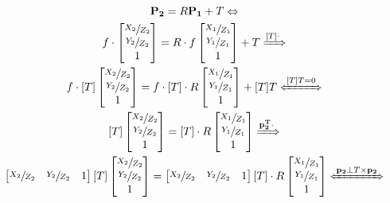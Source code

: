 \begin{equation}
\begin{gathered}
	\mathbf{P_2}  = R\mathbf{P_1} + T \Leftrightarrow \\
	f \cdot \begin{bmatrix} \sfrac{X_2}{Z_2} \\ \sfrac{Y_2}{Z_2} \\ 1 \end{bmatrix} = R \cdot f
	\begin{bmatrix} \sfrac{X_1}{Z_1} \\ \sfrac{Y_1}{Z_1} \\ 1 \end{bmatrix} + T \xRightarrow{[T] \cdot} \\
	f \cdot [T] \begin{bmatrix} \sfrac{X_2}{Z_2} \\ \sfrac{Y_2}{Z_2} \\ 1 \end{bmatrix} = f \cdot[T] \cdot R
	\begin{bmatrix} \sfrac{X_1}{Z_1} \\ \sfrac{Y_1}{Z_1} \\ 1 \end{bmatrix} + [T]T \xLeftrightarrow{[T]T=0} \\
	[T] \begin{bmatrix} \sfrac{X_2}{Z_2} \\ \sfrac{Y_2}{Z_2} \\ 1 \end{bmatrix} = [T] \cdot R
	\begin{bmatrix} \sfrac{X_1}{Z_1} \\ \sfrac{Y_1}{Z_1} \\ 1 \end{bmatrix} \xRightarrow{\mathbf{p_2^T}\cdot} \\
	\begin{bmatrix} \sfrac{X_2}{Z_2} & \sfrac{Y_2}{Z_2} & 1 \end{bmatrix} [T] \begin{bmatrix} \sfrac{X_2}{Z_2} \\ \sfrac{Y_2}{Z_2} \\ 1 \end{bmatrix} = \begin{bmatrix} \sfrac{X_2}{Z_2} & \sfrac{Y_2}{Z_2} & 1 \end{bmatrix} [T] \cdot R
	\begin{bmatrix} \sfrac{X_1}{Z_1} \\ \sfrac{Y_1}{Z_1} \\ 1 \end{bmatrix} \xLeftrightarrow{\mathbf{p_2} \perp T \times\mathbf{p_2}} \\	

\end{gathered}
\end{equation}
